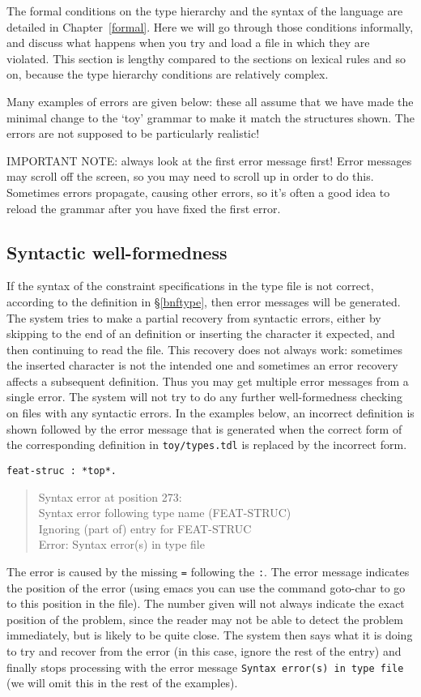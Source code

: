 \documentclass[12pt]{report}
\newenvironment{error}%
{\begin{quote}
\tt
}%
{\end{quote}
}
\begin{document}
The formal conditions on the type hierarchy and the syntax of the
language are
detailed in Chapter~\ref{formal}.
Here we will go through those conditions informally, and discuss what
happens when you try and load a file in which they are violated.
This section is lengthy compared to the sections
on lexical rules and so on, because the type hierarchy conditions
are relatively complex.

Many examples of errors 
are given below: these all assume that we have made the minimal
change to the `toy' grammar to make it match the structures shown.
The errors are not supposed to be particularly realistic!

IMPORTANT NOTE:  always look at the first error message first!
Error messages may scroll off the screen, so you may need to scroll up
in order to do this.  Sometimes errors propagate,
causing other errors, so it's often a good idea to reload the grammar
after you have fixed the first error.

\subsection{Syntactic well-formedness}
\label{synwf}
If the syntax of the constraint specifications in the type file is not 
correct, according to the definition in \S\ref{bnftype},
then error messages will be generated.  The system tries
to make a partial
recovery from syntactic errors, either by
skipping to the end of an definition or inserting the
character it expected,
and then continuing to read the file.
This recovery does not always work: sometimes the
inserted character is not the intended one and sometimes an
error recovery affects a subsequent definition.
Thus you may get multiple error messages from a single error.
The system will
not try to do any further well-formedness checking
on files with any syntactic errors.
In the examples below, an incorrect definition is shown
followed by the error message that is generated when the correct form of the
corresponding definition in {\tt toy/types.tdl} is replaced by 
the incorrect form.

\begin{verbatim}
feat-struc : *top*.
\end{verbatim}
\begin{error}
Syntax error at position 273: \\
Syntax error following type name (FEAT-STRUC)\\
Ignoring (part of) entry for FEAT-STRUC\\
Error: Syntax error(s) in type file
\end{error}
The error is caused by the missing {\tt =} following the
{\tt :}.  The error message indicates the position of
the error (using emacs you can use the command goto-char to
go to this position in the file).  The number given will
not always indicate the exact position of the problem, since the reader
may not be able to detect the problem immediately, but is likely to be quite close.  
The system then says what it is doing to try and recover from the error
(in this case, ignore the rest of the entry) and finally stops processing with
the error message {\tt Syntax error(s) in type file} (we will
omit this in the rest of the examples).
\end{document}
